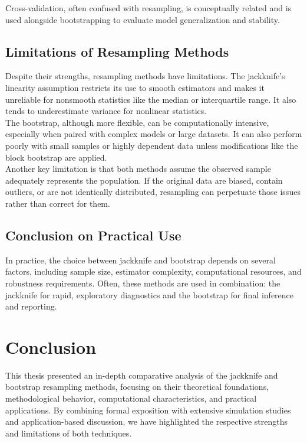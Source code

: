 \documentclass{article}
\begin{document}
Cross-validation, often confused with resampling, is conceptually related and is used alongside bootstrapping to evaluate model generalization and stability. \\

\subsection{Limitations of Resampling Methods}

Despite their strengths, resampling methods have limitations. The jackknife's linearity assumption restricts its use to smooth estimators and makes it unreliable for nonsmooth statistics like the median or interquartile range. It also tends to underestimate variance for nonlinear statistics. \\

The bootstrap, although more flexible, can be computationally intensive, especially when paired with complex models or large datasets. It can also perform poorly with small samples or highly dependent data unless modifications like the block bootstrap are applied. \\

Another key limitation is that both methods assume the observed sample adequately represents the population. If the original data are biased, contain outliers, or are not identically distributed, resampling can perpetuate those issues rather than correct for them. \\

\subsection{Conclusion on Practical Use}

In practice, the choice between jackknife and bootstrap depends on several factors, including sample size, estimator complexity, computational resources, and robustness requirements. Often, these methods are used in combination: the jackknife for rapid, exploratory diagnostics and the bootstrap for final inference and reporting. \\

\section{Conclusion}

This thesis presented an in-depth comparative analysis of the jackknife and bootstrap resampling methods, focusing on their theoretical foundations, methodological behavior, computational characteristics, and practical applications. By combining formal exposition with extensive simulation studies and application-based discussion, we have highlighted the respective strengths and limitations of both techniques. \\
\end{document}
